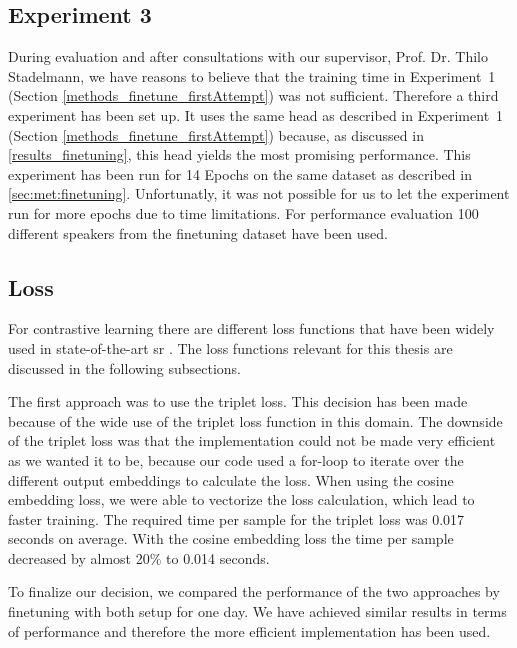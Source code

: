 \subsection{Experiment 3}
\label{methods_finetune_thirdAttempt}
During evaluation and after consultations with our supervisor, Prof. Dr. Thilo Stadelmann, we have reasons to believe that the training time in Experiment~1 (Section \ref{methods_finetune_firstAttempt}) was not sufficient. Therefore a third experiment has been set up. It uses the same head as described in Experiment~1 (Section \ref{methods_finetune_firstAttempt}) because, as discussed in \ref{results_finetuning}, this head yields the most promising performance. This experiment has been run for 14 Epochs on the same dataset as described in \ref{sec:met:finetuning}. Unfortunatly, it was not possible for us to let the experiment run for more epochs due to time limitations. For performance evaluation 100 different speakers from the finetuning dataset have been used.

\subsection{Loss}
\label{methods_contrastive_loss}

For contrastive learning there are different loss functions that have been widely used in state-of-the-art \gls{sr} \cite{chung2020ContrastiveLoss, bjorn2019cosineloss}. The loss functions relevant for this thesis are discussed in the following subsections. 

The first approach was to use the triplet loss. This decision has been made because of the wide use of the triplet loss function in this domain. The downside of the triplet loss was that the implementation could not be made very efficient as we wanted it to be, because our code used a for-loop to iterate over the different output embeddings to calculate the loss. When using the cosine embedding loss, we were able to vectorize the loss calculation, which lead to faster training. The required time per sample for the triplet loss was 0.017 seconds on average. With the cosine embedding loss the time per sample decreased by almost 20\% to 0.014 seconds. 

To finalize our decision, we compared the performance of the two approaches by finetuning with both setup for one day. We have achieved similar results in terms of performance and therefore the more efficient implementation has been used. 


